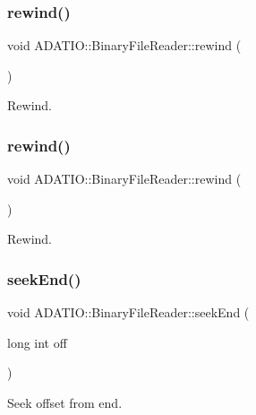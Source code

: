 \subsubsection{\texorpdfstring{rewind()}{rewind()}\hspace{0.1cm}{\footnotesize\ttfamily [1/2]}}
{\footnotesize\ttfamily void A\+D\+A\+T\+I\+O\+::\+Binary\+File\+Reader\+::rewind (\begin{DoxyParamCaption}{ }\end{DoxyParamCaption})}



Rewind. 

\mbox{\label{classADATIO_1_1BinaryFileReader_a4f15e41f00be97ad3a0e8bb97c90b704}} 
\subsubsection{\texorpdfstring{rewind()}{rewind()}\hspace{0.1cm}{\footnotesize\ttfamily [2/2]}}
{\footnotesize\ttfamily void A\+D\+A\+T\+I\+O\+::\+Binary\+File\+Reader\+::rewind (\begin{DoxyParamCaption}{ }\end{DoxyParamCaption})}



Rewind. 

\mbox{\label{classADATIO_1_1BinaryFileReader_a1ae70d2eb56f1c1b1769ce9557f8ebbf}} 
\subsubsection{\texorpdfstring{seekEnd()}{seekEnd()}\hspace{0.1cm}{\footnotesize\ttfamily [1/2]}}
{\footnotesize\ttfamily void A\+D\+A\+T\+I\+O\+::\+Binary\+File\+Reader\+::seek\+End (\begin{DoxyParamCaption}\item[{long int}]{off }\end{DoxyParamCaption})}



Seek offset from end. 

